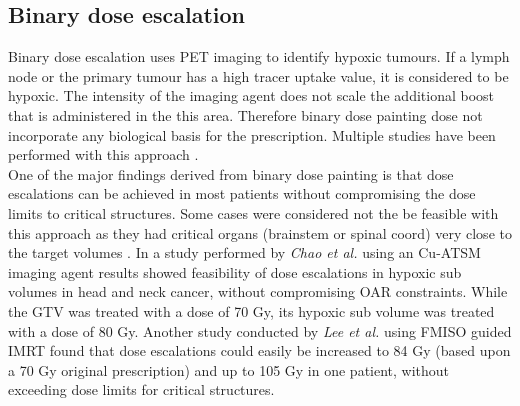 \subsection{Binary dose escalation}
Binary dose escalation uses PET imaging to identify hypoxic tumours. If a lymph node or the primary tumour has a high tracer uptake value, it is considered to be hypoxic. The intensity of the imaging agent does not scale the additional boost that is administered in the this area. Therefore binary dose painting dose not incorporate any biological basis for the prescription. Multiple studies have been performed with this approach \cite{pmid20855118, pmid11240261, pmid17869020}.\\One of the major findings derived from binary dose painting is that dose escalations can be achieved in most patients without compromising the dose limits to critical structures. Some cases were considered not the be feasible with this approach as they had critical organs (brainstem or spinal coord) very close to the target volumes \cite{pmid20855118}. In a study performed by \textit{Chao et al.} \cite{pmid11240261} using an Cu-ATSM imaging agent results showed feasibility of dose escalations in hypoxic sub volumes in head and neck cancer, without compromising OAR constraints. While the GTV was treated with a dose of 70 Gy, its hypoxic sub volume was treated with a dose of 80 Gy. Another study conducted by \textit{Lee et al.} \cite{pmid17869020} using FMISO guided IMRT found that dose escalations could easily be increased to 84 Gy (based upon a 70 Gy original prescription) and up to 105 Gy in one patient, without exceeding dose limits for critical structures. 
